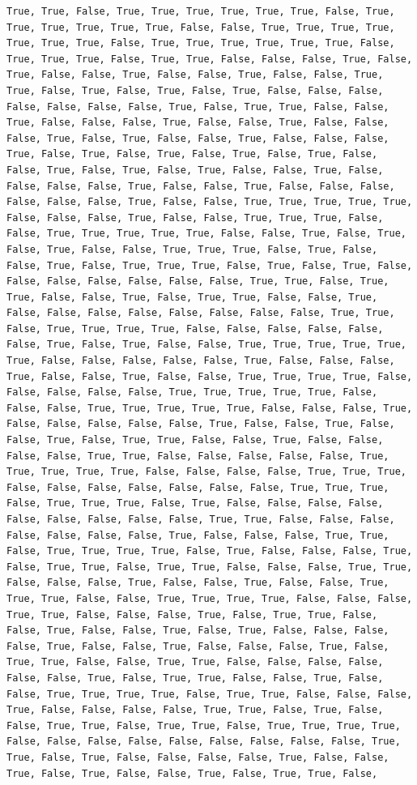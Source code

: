 \documentclass[
  letterpaper,
  DIV=11,
  numbers=noendperiod]{scrartcl}
\begin{document}
\begin{verbatim}
True, True, False, True, True, True, True, True, True, False, True, True, True, True, True, True, False, False, True, True, True, True, True, True, True, False, True, True, True, True, True, True, False, True, True, True, False, True, True, False, False, False, True, False, True, False, False, True, False, False, True, False, False, True, True, False, True, False, True, False, True, False, False, False, False, False, False, False, True, False, True, True, False, False, True, False, False, False, True, False, False, True, False, False, False, True, False, True, False, False, True, False, False, False, True, False, True, False, True, False, True, False, True, False, False, True, False, True, False, True, False, False, True, False, False, False, False, True, False, False, True, False, False, False, False, False, False, True, False, False, True, True, True, True, True, False, False, False, True, False, False, True, True, True, False, False, True, True, True, True, True, False, False, True, False, True, False, True, False, False, True, True, True, False, True, False, False, True, False, True, True, True, False, True, False, True, False, False, False, False, False, False, False, True, True, False, True, True, False, False, True, False, True, True, False, False, True, False, False, False, False, False, False, False, False, True, True, False, True, True, True, True, False, False, False, False, False, False, True, False, True, False, False, True, True, True, True, True, True, False, False, False, False, False, True, False, False, False, True, False, False, True, False, False, True, True, True, True, False, False, False, False, False, True, True, True, True, True, False, False, False, True, True, True, True, True, False, False, False, True, False, False, False, False, False, True, False, False, True, False, False, True, False, True, True, False, False, True, False, False, False, False, True, True, False, False, False, False, False, True, True, True, True, True, False, False, False, False, True, True, True, False, False, False, False, False, False, False, True, True, True, False, True, True, True, False, True, False, False, False, False, False, False, False, False, False, True, True, False, False, False, False, False, False, False, True, False, False, False, True, True, False, True, True, True, True, False, True, False, False, False, True, False, True, True, False, True, True, False, False, False, True, True, False, False, False, True, False, False, True, False, False, True, True, True, False, False, True, True, True, True, False, False, False, True, True, False, False, False, True, False, True, True, False, False, True, False, False, True, False, True, False, False, False, False, True, False, False, True, False, False, False, True, False, True, True, False, False, True, True, False, False, False, False, False, False, True, False, True, True, False, False, True, False, False, True, True, True, True, False, True, True, False, False, False, True, False, False, False, False, True, True, False, True, False, False, True, True, False, True, True, False, True, True, True, True, False, False, False, False, False, False, False, False, False, True, True, False, True, False, False, False, False, True, False, False, True, False, True, False, False, True, False, True, True, False, 
\end{verbatim}
\end{document}
